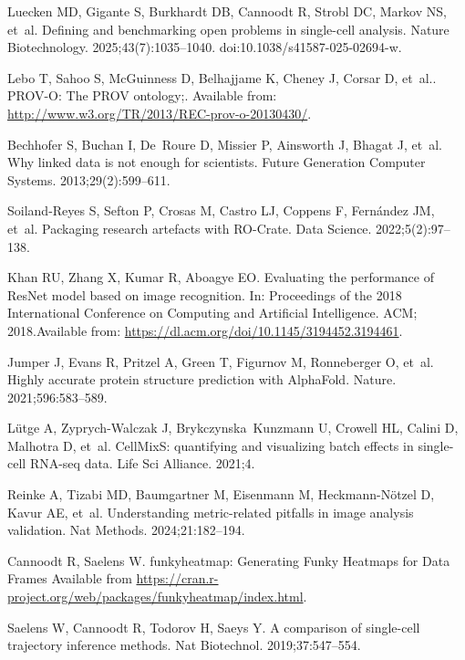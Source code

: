 \documentclass[11pt]{article}
\begin{document}
\begin{thebibliography}{10}
Luecken MD, Gigante S, Burkhardt DB, Cannoodt R, Strobl DC, Markov NS, et~al.
\newblock Defining and benchmarking open problems in single-cell analysis.
\newblock Nature Biotechnology. 2025;43(7):1035--1040.
\newblock doi:{10.1038/s41587-025-02694-w}.

Lebo T, Sahoo S, McGuinness D, Belhajjame K, Cheney J, Corsar D, et~al..
  PROV-O: The PROV ontology;.
\newblock Available from: \url{http://www.w3.org/TR/2013/REC-prov-o-20130430/}.

Bechhofer S, Buchan I, De~Roure D, Missier P, Ainsworth J, Bhagat J, et~al.
\newblock Why linked data is not enough for scientists.
\newblock Future Generation Computer Systems. 2013;29(2):599--611.

Soiland-Reyes S, Sefton P, Crosas M, Castro LJ, Coppens F, Fern{\'a}ndez JM,
  et~al.
\newblock Packaging research artefacts with RO-Crate.
\newblock Data Science. 2022;5(2):97--138.

Khan RU, Zhang X, Kumar R, Aboagye EO.
\newblock Evaluating the performance of {ResNet} model based on image
  recognition.
\newblock In: Proceedings of the 2018 International Conference on Computing and
  Artificial Intelligence. ACM; 2018.Available from:
  \url{https://dl.acm.org/doi/10.1145/3194452.3194461}.

Jumper J, Evans R, Pritzel A, Green T, Figurnov M, Ronneberger O, et~al.
\newblock Highly accurate protein structure prediction with AlphaFold.
\newblock Nature. 2021;596:583--589.

Lütge A, Zyprych-Walczak J, Brykczynska~Kunzmann U, Crowell HL, Calini D,
  Malhotra D, et~al.
\newblock CellMixS: quantifying and visualizing batch effects in single-cell
  RNA-seq data.
\newblock Life Sci Alliance. 2021;4.

Reinke A, Tizabi MD, Baumgartner M, Eisenmann M, Heckmann-Nötzel D, Kavur AE,
  et~al.
\newblock Understanding metric-related pitfalls in image analysis validation.
\newblock Nat Methods. 2024;21:182--194.

Cannoodt R, Saelens W. 
\newblock funkyheatmap: Generating Funky Heatmaps for Data Frames
\newblock Available from \url{https://cran.r-project.org/web/packages/funkyheatmap/index.html}.

Saelens W, Cannoodt R, Todorov H, Saeys Y.
\newblock A comparison of single-cell trajectory inference methods.
\newblock Nat Biotechnol. 2019;37:547--554.


\end{thebibliography}
\end{document}
